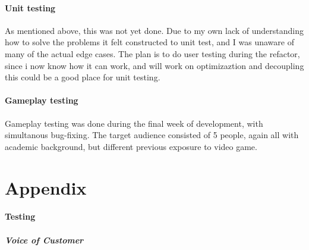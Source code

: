 \documentclass{article}
\begin{document}
\paragraph{Unit testing}
As mentioned above, this was not yet done. Due to my own lack of understanding how to solve the problems it felt constructed to unit test, and I was unaware of many of the actual edge cases. The plan is to do user testing during the refactor, since i now know how it can work, and will work on optimizaztion and decoupling this could be a good place for unit testing.

\paragraph{Gameplay testing}
Gameplay testing was done during the final week of development, with simultanous bug-fixing. The target audience consisted of 5 people, again all with academic background, but different previous exposure to video game. 





\section{Appendix}
\paragraph{Testing}
\subparagraph{Voice of Customer}

\end{document}
